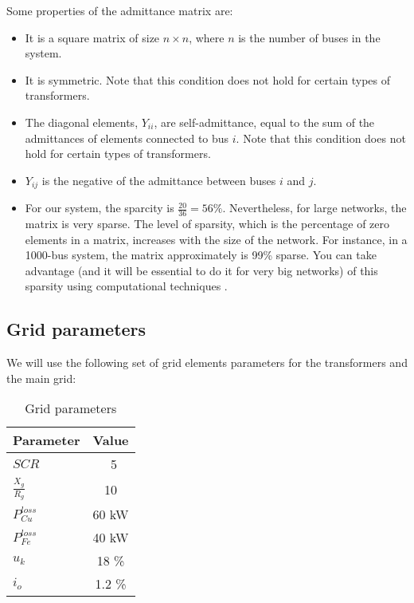 \documentclass[a4paper,11pt, titlepage, twoside]{article}
\begin{document}
Some properties of the admittance matrix are:
\begin{itemize}[itemsep=0pt]
    \item It is a square matrix of size $n \times n$, where $n$ is the number of buses in the system.
    \item It is symmetric. Note that this condition does not hold for certain types of transformers.
    \item The diagonal elements, $Y_{ii}$, are self-admittance, equal to the sum of the admittances of elements connected to bus $i$. Note that this condition does not hold for certain types of transformers.
    \item $Y_{ij}$ is the negative of the admittance between buses $i$ and $j$.
    \item  For our system, the sparcity is $\frac{20}{36}= 56\%$. Nevertheless, for large networks, the matrix is very sparse. The level of sparsity, which is the percentage of zero elements in a matrix, increases with the size of the network.
    For instance, in a 1000-bus system, the matrix approximately is 99\% sparse. You can take advantage (and it will be essential to do it for very big networks) of this sparsity using computational techniques \cite{sparcity}.
\end{itemize}

\subsection{Grid parameters}

We will use the following set of grid elements parameters for the transformers and the main grid:
\begin{table}[h]
    \centering
    \renewcommand{\arraystretch}{1.2}
    \begin{tabular}{l|c}
    \hline
    \textbf{Parameter} & \textbf{Value} \\
    \hline
    $SCR$ & \ 5 \\
    $\frac{X_g}{R_g}$ & 10 \\
    $P_{Cu}^{loss}$ & 60 kW \\
    $P_{Fe}^{loss}$ & 40 kW \\
    $u_k$ & 18 \%  \\
    $i_o$ & 1.2 \% \\
    \hline
    \end{tabular}
    \caption{Grid parameters \cite{paperbase}}
    \label{tab:gridparameters}
    \end{table}
\end{document}

